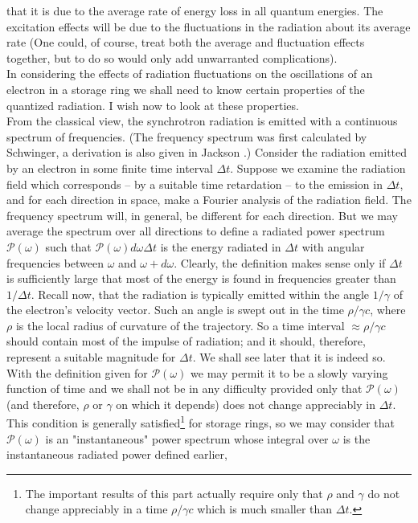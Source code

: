  that it is due to the average rate of energy loss in all quantum energies. The excitation
 effects will be due to the fluctuations in the radiation about its average rate (One could, of
course, treat both the average and fluctuation effects together, but to do so would only add unwarranted complications).\\
In considering the effects of radiation fluctuations on the oscillations of an electron in a storage ring we shall need to know certain properties of the quantized radiation. I wish now to look at these properties.\\
From the classical view, the synchrotron radiation is emitted with a continuous spectrum of frequencies. (The frequency spectrum was first calculated by \cite{13} Schwinger, a derivation
 is also given in Jackson \cite{10}.) Consider the radiation emitted by an electron in some finite time interval $\Delta t$. Suppose we examine the radiation field which corresponds
 -- by a suitable time retardation -- to the emission in $\Delta t$, and for each direction in space, make a Fourier analysis of the radiation field. The frequency spectrum will, in general,
 be different for each direction. But we may average the spectrum over all directions to define a radiated power spectrum $\mathscr{P}(\omega)$ such that $\mathscr{P}(\omega)d\omega \Delta t$ is the energy radiated in $\Delta t$ with angular frequencies between $\omega$ and $\omega + d\omega$. Clearly, the definition makes sense only if $\Delta t$ is sufficiently large that most of the energy is found in frequencies greater than $1/\Delta t$. Recall now, that the radiation
 is typically emitted within the angle $1/\gamma$ of the electron's velocity vector. Such an angle is swept out in the time $\rho/\gamma c$, where $\rho$ is the local radius of curvature
 of the trajectory. So a time interval $\approx \rho/\gamma c$ should contain most of the impulse of radiation; and it should, therefore, represent a suitable magnitude for $\Delta t$. We shall see later that it is indeed so.\\
With the definition given for $\mathscr{P}(\omega)$ we may permit it to be a slowly varying
function of time and we shall not be in any difficulty provided only that $\mathscr{P}(\omega)$
 (and therefore, $\rho$ or $\gamma$ on which it depends) does not change appreciably in $\Delta t$. This condition is generally satisfied\footnote{The important results of this part actually require only that $\rho$ and $\gamma$ do not change appreciably in a time $\rho/\gamma c$ which is much smaller than $\Delta t$.} for storage rings, so we may consider that $\mathscr{P}(\omega)$ is an "instantaneous" power spectrum whose integral over $\omega$ is the instantaneous radiated power defined earlier,
